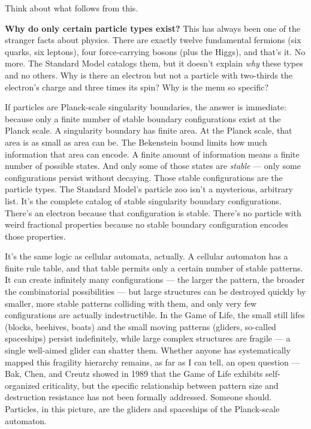 \documentclass[11pt, twoside, openright]{book}
\begin{document}
Think about what follows from this.

\textbf{Why do only certain particle types exist?} This has always been one of the stranger facts about physics. There are exactly twelve fundamental fermions (six quarks, six leptons), four force-carrying bosons (plus the Higgs), and that's it. No more. The Standard Model catalogs them, but it doesn't explain \textit{why} these types and no others. Why is there an electron but not a particle with two-thirds the electron's charge and three times its spin? Why is the menu so specific?

If particles are Planck-scale singularity boundaries, the answer is immediate: because only a finite number of stable boundary configurations exist at the Planck scale. A singularity boundary has finite area. At the Planck scale, that area is as small as area can be. The Bekenstein bound limits how much information that area can encode. A finite amount of information means a finite number of possible states. And only some of those states are \textit{stable} --- only some configurations persist without decaying. Those stable configurations are the particle types. The Standard Model's particle zoo isn't a mysterious, arbitrary list. It's the complete catalog of stable singularity boundary configurations. There's an electron because that configuration is stable. There's no particle with weird fractional properties because no stable boundary configuration encodes those properties.

It's the same logic as cellular automata, actually. A cellular automaton has a finite rule table, and that table permits only a certain number of stable patterns. It can create infinitely many configurations --- the larger the pattern, the broader the combinatorial possibilities --- but large structures can be destroyed quickly by smaller, more stable patterns colliding with them, and only very few configurations are actually indestructible. In the Game of Life, the small still lifes (blocks, beehives, boats) and the small moving patterns (gliders, so-called spaceships) persist indefinitely, while large complex structures are fragile --- a single well-aimed glider can shatter them. Whether anyone has systematically mapped this fragility hierarchy remains, as far as I can tell, an open question --- Bak, Chen, and Creutz showed in 1989 that the Game of Life exhibits self-organized criticality, but the specific relationship between pattern size and destruction resistance has not been formally addressed. Someone should. Particles, in this picture, are the gliders and spaceships of the Planck-scale automaton.
\end{document}

